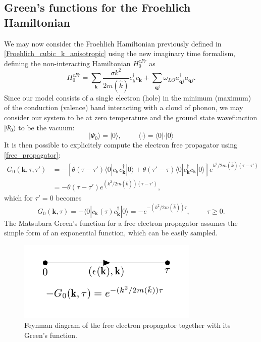 \subsection{Green's functions for the Froehlich Hamiltonian}
We may now consider the Froehlich Hamiltonian previously defined in \ref{Froehlich_cubic_k_anisotropic} using the new imaginary time formalism,
defining the non-interacting Hamiltonian $H^{cFr}_0$ as 
\begin{equation}
    H^{cFr}_0=\sum_\mathbf{k}\frac{\sigma k^2}{2m(\hat{k})}c^\dagger_{\mathbf{k}}c_\mathbf{k}+\sum_{\mathbf{q}j}\omega_{LO}a^\dagger_{\mathbf{q}j}a_{\mathbf{q}j}.
    \label{polaron_non-interacting}
\end{equation}
Since our model consists of a single electron (hole) in the minimum (maximum) of the conduction (valence) band interacting with a cloud of phonon, we may 
consider our system to be at zero temperature and the ground state wavefunction $|\Psi_0\rangle$ to be the vacuum:
\begin{equation}
    |\Psi_0\rangle=|0\rangle,\hspace{1cm}\langle \cdot \rangle=\langle 0|\cdot|0\rangle
\end{equation}
It is then possible to explicitely compute the electron free propagator using \ref{free_propagator}:
\begin{equation}
\begin{split}
    G_0(\mathbf{k},\tau,\tau')&=-\left[\theta(\tau-\tau')\langle 0| c_\mathbf{k}c^\dagger_\mathbf{k}|0\rangle+\theta(\tau'-\tau)\langle 0 | c^\dagger_\mathbf{k}c_\mathbf{k}|0\rangle\right]e^{k^2/2m(\hat{k})(\tau-\tau')}\\
    &=-\theta(\tau-\tau')e^{(k^2/2m(\hat{k}))(\tau-\tau')},
\end{split}
\end{equation}
which for $\tau'=0$ becomes
\begin{equation}
    G_0(\mathbf{k},\tau)=-\langle 0|c_{\mathbf{k}}(\tau)c^\dagger_\mathbf{k}|0\rangle =-e^{-(k^2/2m(\hat{k}))\tau},\hspace{1cm}\tau\ge0.
\end{equation}
The Matsubara Green's function for a free electron propagator assumes the simple form of an exponential function, which can be easily sampled.
\begin{figure}[H]
    \centering
    \includegraphics[scale=1.5]{free_el_propagator.pdf}
    \caption{Feynman diagram of the free electron propagator together with its Green's function.}
    \label{fig:el_prop_free}
\end{figure}
